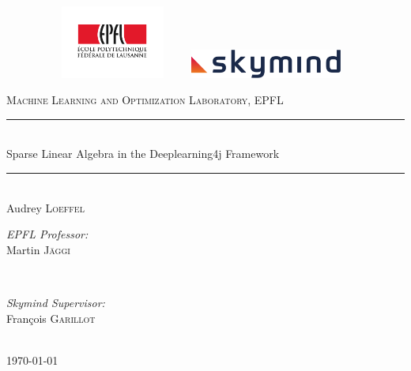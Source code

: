 \begin{titlepage}
	\newcommand{\HRule}{\rule{\linewidth}{0.5mm}} %
	\center
	
	\begin{figure}[!tbp]
		\centering
		\begin{minipage}[b]{0.4\textwidth}
			\includegraphics[width=5cm,height=2.4cm]{images/epfl.pdf}
			\vspace{2cm}
		\end{minipage}
		\hfill
		\begin{minipage}[b]{0.4\textwidth}
			\includegraphics[width=5cm,]{images/skymind.png}
				\vspace{2cm}
		\end{minipage}
	\end{figure}
	

	
	\textsc{\large Machine Learning and Optimization Laboratory, EPFL}\\[0.3cm] 
	\vspace{3cm}
	
	{ 
		\HRule \\[0.4cm]
		\LARGE Sparse Linear Algebra in the Deeplearning4j Framework} %
	\HRule \\[1.5cm]
	
	\Large Audrey \textsc{Loeffel}\\ %
	\vspace{2.5cm}
	
	\begin{minipage}[t]{0.4\textwidth}
		\begin{flushleft} \large
			\emph{EPFL Professor:} \\
			Martin \textsc{Jäggi}\\ %
		\end{flushleft}
	\end{minipage}
	~
	\begin{minipage}[t]{0.4\textwidth}
		\begin{flushright} \large
			\emph{Skymind Supervisor:} \\
			François \textsc{Garillot}\\ 	
		\end{flushright} 
	\end{minipage}\\[3cm]
	
	{\large \today}\\ %
	
	
	\vfill %
	
\end{titlepage}

